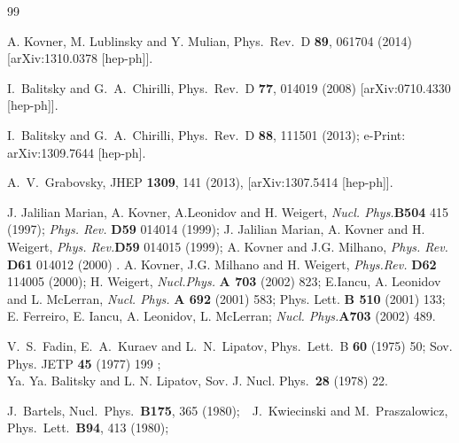 \documentclass[11pt,a4paper]{article}
\begin{document}
\begin{thebibliography}{99}

 A. Kovner, M. Lublinsky and Y. Mulian,  Phys.\ Rev.\ D {\bf 89}, 061704 (2014)
  [arXiv:1310.0378 [hep-ph]].
 
  I.~Balitsky and G.~A.~Chirilli,
  Phys.\ Rev.\ D {\bf 77}, 014019 (2008)
  [arXiv:0710.4330 [hep-ph]].
 
    I.~Balitsky and G.~A.~Chirilli, 
Phys.\ Rev.\ D {\bf 88}, 111501 (2013);
e-Print: arXiv:1309.7644 [hep-ph].

  A.~V.~Grabovsky, JHEP {\bf 1309}, 141 (2013), 
  [arXiv:1307.5414 [hep-ph]].


             
 J. Jalilian Marian, A. Kovner, A.Leonidov and H.
Weigert,
{\it Nucl. Phys.}{\bf  B504} 415 (1997); %
{\it Phys. Rev.} {\bf D59} 014014 (1999); %
J. Jalilian Marian, A. Kovner and H. Weigert, {\it Phys. Rev.}{\bf D59} 
014015 (1999); 
A. Kovner and J.G. Milhano, {\it Phys. Rev.} {\bf D61} 014012 (2000) .
 A. Kovner, J.G. Milhano and H. Weigert,
{\it Phys.Rev.} {\bf D62} 114005 (2000); 
 H. Weigert, {\it Nucl.Phys.} {\bf A 703} (2002) 823;
  E.Iancu, A. Leonidov and L. McLerran, {\it Nucl. Phys.} 
{\bf A 692} (2001) 583; {Phys. Lett.} {\bf B
510} (2001) 133;
E. Ferreiro, E. Iancu, A. Leonidov, L. McLerran;  
{\it Nucl. Phys.}{\bf A703} (2002) 489.


 V.~S.~Fadin, E.~A.~Kuraev and L.~N.~Lipatov,
  Phys.\ Lett.\  B {\bf 60} (1975) 50;
  Sov. Phys. JETP
                {\bf 45} (1977) 199 ; \\
          Ya. Ya. Balitsky and L. N. Lipatov,
               {  Sov. J. Nucl. Phys.}\, {\bf 28} (1978) 22.
               
              
J.~Bartels,
%
Nucl.\ Phys.\  {\bf B175}, 365 (1980);\,\,\,\,
J.~Kwiecinski and M.~Praszalowicz,
%
Phys.\ Lett.\  {\bf B94}, 413 (1980);


\end{thebibliography}
\end{document}
